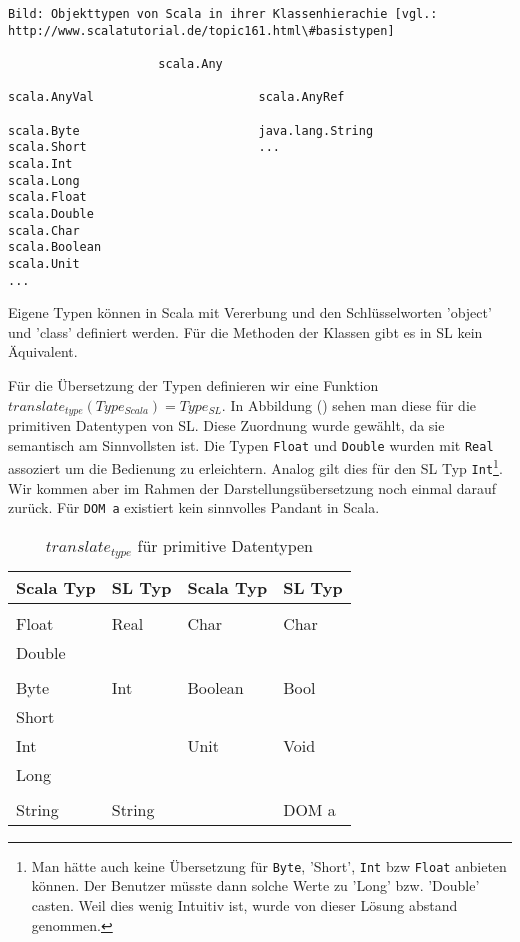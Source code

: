 \documentclass[12pt]{scrreprt}
\begin{document}
\begin{lstlisting}
Bild: Objekttypen von Scala in ihrer Klassenhierachie [vgl.: http://www.scalatutorial.de/topic161.html\#basistypen]

                     scala.Any

scala.AnyVal                       scala.AnyRef

scala.Byte                         java.lang.String
scala.Short                        ...
scala.Int
scala.Long
scala.Float
scala.Double
scala.Char
scala.Boolean
scala.Unit
...
\end{lstlisting}

Eigene Typen können in Scala mit Vererbung und den Schlüsselworten 'object' und 'class' definiert werden. Für die Methoden der Klassen gibt es in \ac{SL} kein Äquivalent.

Für die Übersetzung der Typen definieren wir eine Funktion $translate_{type}(Type_{Scala}) = Type_{SL}$. In Abbildung () sehen man diese für die primitiven Datentypen von \ac{SL}. Diese Zuordnung wurde gewählt, da sie semantisch am Sinnvollsten ist. Die Typen \lstinline!Float! und \lstinline!Double! wurden mit \lstinline!Real! assoziert um die Bedienung zu erleichtern. Analog gilt dies für den \ac{SL} Typ \lstinline!Int!\footnote{Man hätte auch keine Übersetzung für \lstinline!Byte!, 'Short', \lstinline!Int! bzw \lstinline!Float! anbieten können. Der Benutzer müsste dann solche Werte zu 'Long' bzw. 'Double' casten. Weil dies wenig Intuitiv ist, wurde von dieser Lösung abstand genommen.}. Wir kommen aber im Rahmen der Darstellungsübersetzung noch einmal darauf zurück. Für \lstinline!DOM a! existiert kein sinnvolles Pandant in Scala.

\begin{table}
\caption{$translate_{type}$ für primitive Datentypen}
\centering
\begin{tabular}{ll|ll}
Scala Typ & \ac{SL} Typ & Scala Typ & \ac{SL} Typ \\
\hline
\\
 Float & Real & Char & Char\\
   Double   &  \\
      &&&\\
Byte  &   Int & Boolean & Bool \\
 Short     &  \\
 Int    &  & Unit &  Void\\
  Long   &  \\
     &&&\\
 String & String &  & DOM a \\

\end{tabular}
\end{table}
\end{document}
